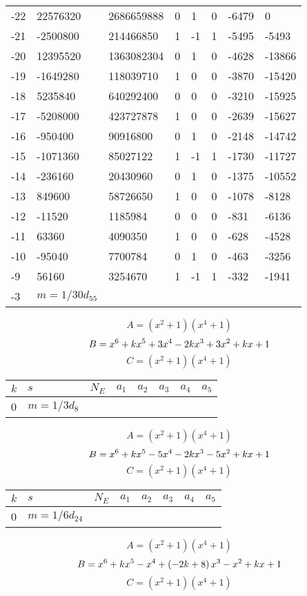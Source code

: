 \documentclass{amsart}
\begin{document}
\begin{longtable}{|l|l|l|lllll|}
-22&22576320&2686659888&0&1&0&-6479&0\\
-21&-2500800&214466850&1&-1&1&-5495&-5493\\
-20&12395520&1363082304&0&1&0&-4628&-13866\\
-19&-1649280&118039710&1&0&0&-3870&-15420\\
-18&5235840&640292400&0&0&0&-3210&-15925\\
-17&-5208000&423727878&1&0&0&-2639&-15627\\
-16&-950400&90916800&0&1&0&-2148&-14742\\
-15&-1071360&85027122&1&-1&1&-1730&-11727\\
-14&-236160&20430960&0&1&0&-1375&-10552\\
-13&849600&58726650&1&0&0&-1078&-8128\\
-12&-11520&1185984&0&0&0&-831&-6136\\
-11&63360&4090350&1&0&0&-628&-4528\\
-10&-95040&7700784&0&1&0&-463&-3256\\
-9&56160&3254670&1&-1&1&-332&-1941\\
-3&$m=1/30d_{55}$&&\multicolumn{5}{c|}{}\\
\hline
\end{longtable}
$$A=(x^2
 + 1)(x^4
 + 1)$$
$$B=x^6
 + k\*x^5
 + 3\*x^4
 - 2\*k\*x^3
 + 3\*x^2
 + k\*x
 + 1$$
$$C=(x^2
 + 1)(x^4
 + 1)$$
\begin{longtable}{|l|l|l|lllll|}
\hline
$k$ & $s$ & $N_E$ & $a_1$ & $a_2$ & $a_3$ & $a_4$ & $a_5$\\
\hline
0&$m=1/3d_{8}$&&\multicolumn{5}{c|}{}\\
\hline
\end{longtable}
$$A=(x^2
 + 1)(x^4
 + 1)$$
$$B=x^6
 + k\*x^5
 - 5\*x^4
 - 2\*k\*x^3
 - 5\*x^2
 + k\*x
 + 1$$
$$C=(x^2
 + 1)(x^4
 + 1)$$
\begin{longtable}{|l|l|l|lllll|}
\hline
$k$ & $s$ & $N_E$ & $a_1$ & $a_2$ & $a_3$ & $a_4$ & $a_5$\\
\hline
0&$m=1/6d_{24}$&&\multicolumn{5}{c|}{}\\
\hline
\end{longtable}
$$A=(x^2
 + 1)(x^4
 + 1)$$
$$B=x^6
 + k\*x^5
 - x^4
 + \left(-2\*k
 + 8\right) \*x^3
 - x^2
 + k\*x
 + 1$$
$$C=(x^2
 + 1)(x^4
 + 1)$$
\end{document}

